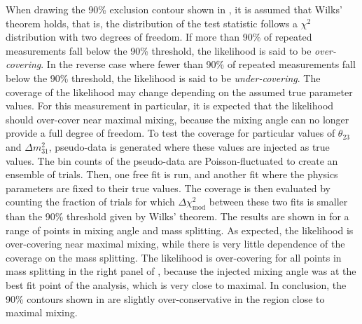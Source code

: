 When drawing the 90\% exclusion contour shown in , it is assumed that Wilks' theorem holds, that is, the distribution of the test statistic follows a $\chi^2$ distribution with two degrees of freedom. If more than 90\% of repeated measurements fall below the 90\% threshold, the likelihood is said to be \emph{over-covering}. In the reverse case where fewer than 90\% of repeated measurements fall below the 90\% threshold, the likelihood is said to be \emph{under-covering}. The coverage of the likelihood may change depending on the assumed true parameter values. For this measurement in particular, it is expected that the likelihood should over-cover near maximal mixing, because the mixing angle can no longer provide a full degree of freedom. To test the coverage for particular values of $\theta_{23}$ and $\Delta m^2_{31}$, pseudo-data is generated where these values are injected as true values. The bin counts of the pseudo-data are Poisson-fluctuated to create an ensemble of trials. Then, one free fit is run, and another fit where the physics parameters are fixed to their true values. The coverage is then evaluated by counting the fraction of trials for which $\Delta \chi^2_{\mathrm{mod}}$ between these two fits is smaller than the 90\% threshold given by Wilks' theorem. The results are shown in  for a range of points in mixing angle and mass splitting. As expected, the likelihood is over-covering near maximal mixing, while there is very little dependence of the coverage on the mass splitting. The likelihood is over-covering for all points in mass splitting in the right panel of , because the injected mixing angle was at the best fit point of the analysis, which is very close to maximal. In conclusion, the 90\% contours shown in  are slightly over-conservative in the region close to maximal mixing.

